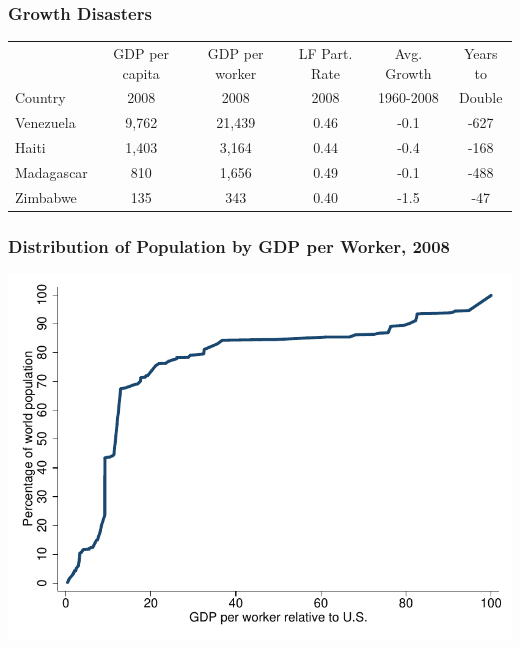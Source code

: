 \documentclass[shownotes,11pt, aspectratio=169]{beamer}
\begin{document}
\begin{frame}
\frametitle{Growth Disasters}
\begin{tabular}{lccccc}\hline
 & GDP per capita & GDP per worker & LF Part. Rate & Avg. Growth & Years to \\
Country & 2008 & 2008 & 2008 & 1960-2008 &  Double \\ \hline \hline
Venezuela & 9,762 & 21,439 & 0.46 & -0.1 & -627 \\
Haiti & 1,403 & 3,164 & 0.44 & -0.4 & -168 \\
Madagascar & 810 & 1,656 & 0.49 & -0.1 & -488 \\
Zimbabwe & 135 & 343 & 0.40 & -1.5 & -47 \\  \hline
\end{tabular}
\end{frame}

\begin{frame}
\frametitle{Distribution of Population by GDP per Worker, 2008}
\begin{center}
\includegraphics[scale=0.8]{graphs/figure_1_1.pdf}
\end{center}
\end{frame}
\end{document}
